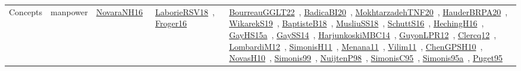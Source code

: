 {\begin{longtable}{lp{3cm}>{\raggedright\arraybackslash}p{6cm}>{\raggedright\arraybackslash}p{6cm}>{\raggedright\arraybackslash}p{8cm}}
Concepts & manpower & \href{works/NovaraNH16.pdf}{NovaraNH16}~\cite{NovaraNH16} & \href{works/LaborieRSV18.pdf}{LaborieRSV18}~\cite{LaborieRSV18}, \href{works/Froger16.pdf}{Froger16}~\cite{Froger16} & \href{works/BourreauGGLT22.pdf}{BourreauGGLT22}~\cite{BourreauGGLT22}, \href{works/BadicaBI20.pdf}{BadicaBI20}~\cite{BadicaBI20}, \href{works/MokhtarzadehTNF20.pdf}{MokhtarzadehTNF20}~\cite{MokhtarzadehTNF20}, \href{works/HauderBRPA20.pdf}{HauderBRPA20}~\cite{HauderBRPA20}, \href{works/WikarekS19.pdf}{WikarekS19}~\cite{WikarekS19}, \href{works/BaptisteB18.pdf}{BaptisteB18}~\cite{BaptisteB18}, \href{works/MusliuSS18.pdf}{MusliuSS18}~\cite{MusliuSS18}, \href{works/SchuttS16.pdf}{SchuttS16}~\cite{SchuttS16}, \href{works/HechingH16.pdf}{HechingH16}~\cite{HechingH16}, \href{works/GayHS15a.pdf}{GayHS15a}~\cite{GayHS15a}, \href{works/GaySS14.pdf}{GaySS14}~\cite{GaySS14}, \href{works/HarjunkoskiMBC14.pdf}{HarjunkoskiMBC14}~\cite{HarjunkoskiMBC14}, \href{works/GuyonLPR12.pdf}{GuyonLPR12}~\cite{GuyonLPR12}, \href{works/Clercq12.pdf}{Clercq12}~\cite{Clercq12}, \href{works/LombardiM12.pdf}{LombardiM12}~\cite{LombardiM12}, \href{works/SimonisH11.pdf}{SimonisH11}~\cite{SimonisH11}, \href{works/Menana11.pdf}{Menana11}~\cite{Menana11}, \href{works/Vilim11.pdf}{Vilim11}~\cite{Vilim11}, \href{works/ChenGPSH10.pdf}{ChenGPSH10}~\cite{ChenGPSH10}, \href{works/NovasH10.pdf}{NovasH10}~\cite{NovasH10}, \href{works/Simonis99.pdf}{Simonis99}~\cite{Simonis99}, \href{works/NuijtenP98.pdf}{NuijtenP98}~\cite{NuijtenP98}, \href{works/SimonisC95.pdf}{SimonisC95}~\cite{SimonisC95}, \href{works/Simonis95a.pdf}{Simonis95a}~\cite{Simonis95a}, \href{works/Puget95.pdf}{Puget95}~\cite{Puget95}\\

\end{longtable}}
